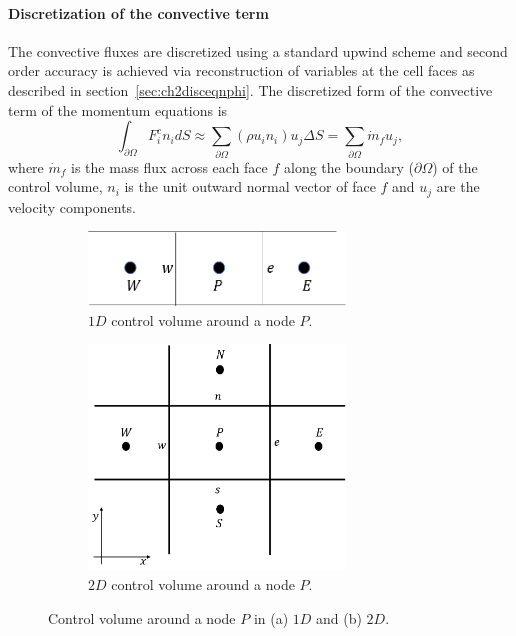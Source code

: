 \paragraph{Discretization of the convective term }
The convective fluxes are discretized using a standard upwind scheme and second order accuracy is achieved via reconstruction of variables at the cell faces as described in section~\ref{sec:ch2disceqnphi}. The discretized form of the convective term of the momentum equations is
\begin{equation}
\int_{\partial\Omega}F^{c}_i n_i dS \approx \sum_{\partial \Omega} (\rho u_i n_i)u_j \Delta S = \sum_{\partial \Omega}\dot{m}_f u_j,
\end{equation}
where $\dot{m}_f$ is the mass flux across each face $f$ along the boundary ($\partial\Omega$) of the control volume, $n_i$ is the unit outward normal vector of face $f$ and $u_j$ are the velocity components. 
\begin{figure}[h!]
    \centering
    \captionsetup{justification=centering}
    \begin{subfigure}[b]{0.48\textwidth}
    \centering
    \captionsetup{justification=centering}
        \includegraphics[width=0.75\textwidth]{ch3_su2eqn/figures/1dcv.png}
        \caption{$1D$ control volume around a node $P$.}
        \label{fig:1dd}
    \end{subfigure}
    \begin{subfigure}[b]{0.48\textwidth}
    \captionsetup{justification=centering}
        \includegraphics[width=0.75\textwidth]{ch2_litsurvey/Figures/2ddomainwaxisneigh.png}
        \caption{$2D$ control volume around a node $P$.}
        \label{fig:2dd}
    \end{subfigure}
    \caption{Control volume around a node $P$ in (a) $1D$ and (b) $2D$.}
\end{figure}
